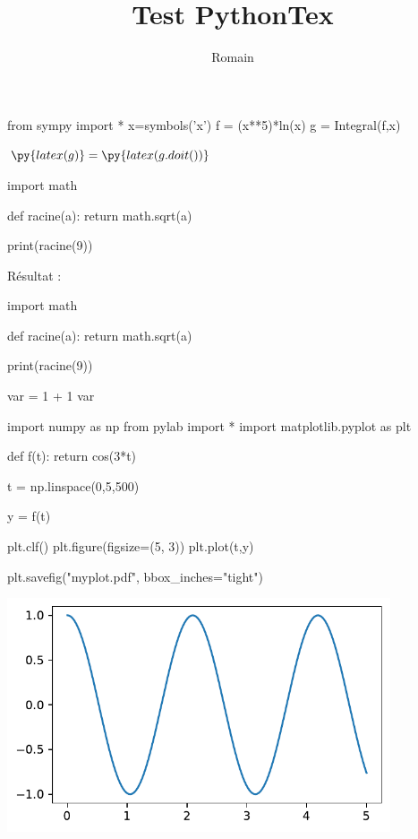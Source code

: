 \documentclass[12pt,a4paper]{article}
\title{Test PythonTex}
\author{Romain}
\begin{document}
\maketitle

\begin{pycode}
from sympy import *
x=symbols('x')
f = (x**5)*ln(x)
g = Integral(f,x)
\end{pycode}
%
$\py{latex(g)} = \py{latex(g.doit())}$
%
\begin{pyverbatim}
import math

def racine(a):
    return math.sqrt(a)

print(racine(9))
\end{pyverbatim}


\bigskip

Résultat : 

\begin{pycode}
import math

def racine(a):
    return math.sqrt(a)

print(racine(9))
\end{pycode}
%
\begin{pyconsole}
var = 1 + 1
var
\end{pyconsole}



%
\begin{pycode}
import numpy as np
from pylab import *
import matplotlib.pyplot as plt


def f(t):
	return cos(3*t)
	
t = np.linspace(0,5,500)

y = f(t)

plt.clf()
plt.figure(figsize=(5, 3))
plt.plot(t,y)

plt.savefig("myplot.pdf", bbox_inches="tight")
\end{pycode}
%



\begin{center}
\includegraphics[width = 0.85\textwidth]{myplot.pdf}
\end{center}
\end{document}
